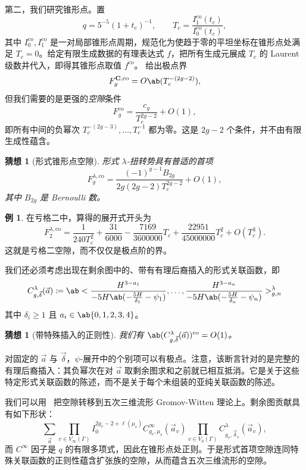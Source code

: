 \documentclass{amsart}
\newtheorem{conj}[thm]{猜想}
\theoremstyle{definition}
\newtheorem{exm}[thm]{例}
\theoremstyle{remark}
\theoremstyle{plain}
\theoremstyle{definition}
\theoremstyle{remark}
\newcommand{\mbf}[1]{\mathbf{#1}}
\newcommand{\mr}[1]{\mathrm{#1}}
\newcommand{\1}{\mathbf{1}}
\newcommand{\2}{\mathbf{2}}
\newcommand{\3}{\mathbf{3}}
\begin{document}
第二，我们研究锥形点。置
\[ q = 5^{-5}(1+t_c)^{-1}, \qquad T_c = \frac{I_1^{\mr{co}}(t_c)}{I_0^{\mr{co}}(t_c)}, \]
其中 \(I_0^{\mr{co}}, I_1^{\mr{co}}\) 是一对局部锥形点周期，规范化为使趋于零的平坦坐标在锥形点处满足 \(T_c = 0\)。给定有限生成数据的有理表达式 \(f\)，把所有生成元展成 \(T_c\) 的 Laurent 级数并代入，即得其锥形点取值 \(f^{\mr{co}}\)。 给出极点界
\[ F_g^{\mbf{C},\mr{co}} = O\ab(T_c^{-(2g-2)}), \]
但我们需要的是更强的\textit{空隙}条件
\[ F_g^{\mr{co}} = \frac{c_g}{T_c^{2g-2}} + O(1), \]
即所有中间的负幂次 \(T_c^{-(2g-3)}, \ldots, T_c^{-1}\) 都为零。这是 \(2g-2\) 个条件，并不由有限生成性蕴含。

\begin{conj}[形式锥形点空隙]%
\label{conj:formal conifold gap}
    形式 \(\lambda\)-扭转势具有普适的首项
    \[ F_g^{\lambda,\mr{co}} = \frac{(-1)^{g-1}B_{2g}}{2g(2g-2)T_c^{2g-2}} + O(1), \]
    其中 \(B_{2g}\) 是 Bernoulli 数。
\end{conj}

\begin{exm}
    在亏格二中，算得的展开式开头为
    \[ F_2^{\lambda,\mr{co}} = \frac{1}{240T_c^2} + \frac{31}{6000} - \frac{7169}{3600000}T_c + \frac{22951}{45000000}T_c^2 + O(T_c^3). \]
    这就是亏格二空隙，而不仅仅是极点阶的界。
\end{exm}

我们还必须考虑出现在剩余图中的、带有有理后裔插入的形式关联函数，即
\[ C^{\lambda}_{g,\vec{\delta}}(\vec{a}) \coloneqq \ab< \frac{H^{3-a_1}}{-5H\ab(-\frac{5H}{\delta_1}-\psi_1)}, \ldots, \frac{H^{3-a_n}}{-5H\ab(-\frac{5H}{\delta_n}-\psi_n)}>^{\lambda}_{g,n} \]
其中 \(\delta_i \geq 1\) 且 \(a_i \in \ab\{0,1,2,3,4\}\)。

\begin{conj}[带特殊插入的正则性]%
\label{conj:special correlator regularity}
    我们有 \(\ab(C^{\lambda}_{g,\vec{\delta}}(\vec{a}))^{\mr{co}} = O(1)\)。
\end{conj}

对固定的 \(\vec{a}\) 与 \(\vec{\delta}\)，\(\psi\)-展开中的个别项可以有极点。注意，该断言针对的是完整的有理后裔插入：其负幂次在对 \(\vec{a}\) 取剩余图求和之前就已相互抵消。它是关于这些特定形式关联函数的陈述，而不是关于每个未组装的亚纯关联函数的陈述。

我们可以用~ 把空隙转移到五次三维流形 Gromov-Witten 理论上。剩余图贡献具有如下形状：
\[ \sum_{\vec{a}} \prod_{v \in V_{\infty}(\Gamma)}I_0^{2g_v-2+\ell(\mu_v)}C^{\infty}_{g_v,\mu_v}(\vec{a}_v)\prod_{v\in V_0(\Gamma)}C^{\lambda}_{g_v,\vec{\delta}_v}(\vec{a}_v), \]
而 \(C^{\infty}\) 因子是 \(q\) 的有限多项式，因此在锥形点处正则。于是形式首项空隙连同特殊关联函数的正则性蕴含扩张族的空隙，从而蕴含五次三维流形的空隙。
\end{document}
